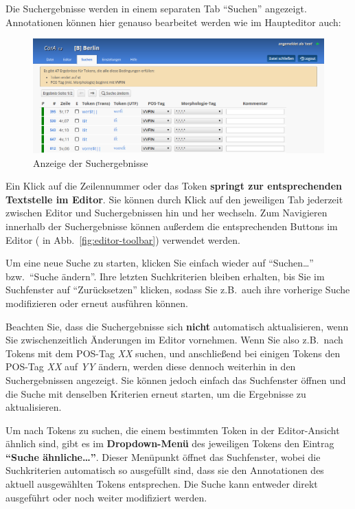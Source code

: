 \documentclass[11pt,a4paper,parskip=half]{scrartcl}
\begin{document}
Die Suchergebnisse werden in einem separaten Tab ``Suchen'' angezeigt.  Annotationen können hier genauso bearbeitet werden wie im Haupteditor auch:

\begin{figure}[!h]
  \centering
  \includegraphics[width=\linewidth]{img/1.2/such-tab2.png}
  \caption{Anzeige der Suchergebnisse}
  \label{fig:such-tab}
\end{figure}

Ein Klick auf die Zeilennummer oder das Token \textbf{springt zur entsprechenden Textstelle im Editor}.  Sie können durch Klick auf den jeweiligen Tab jederzeit zwischen Editor und Suchergebnissen hin und her wechseln.  Zum Navigieren innerhalb der Suchergebnisse können außerdem die entsprechenden Buttons im Editor ( in Abb.~\ref{fig:editor-toolbar}) verwendet werden.

Um eine neue Suche zu starten, klicken Sie einfach wieder auf ``Suchen\ldots'' bzw.\ ``Suche ändern''.  Ihre letzten Suchkriterien bleiben erhalten, bis Sie im Suchfenster auf ``Zurücksetzen'' klicken, sodass Sie z.B.\ auch ihre vorherige Suche modifizieren oder erneut ausführen können.

\begin{infobox}{}
  Beachten Sie, dass die Suchergebnisse sich \textbf{nicht} automatisch aktualisieren, wenn Sie zwischenzeitlich Änderungen im Editor vornehmen.  Wenn Sie also z.B.\ nach Tokens mit dem POS-Tag \emph{XX} suchen, und anschließend bei einigen Tokens den POS-Tag \emph{XX} auf \emph{YY} ändern, werden diese dennoch weiterhin in den Suchergebnissen angezeigt.  Sie können jedoch einfach das Suchfenster öffnen und die Suche mit denselben Kriterien erneut starten, um die Ergebnisse zu aktualisieren.
\end{infobox}

Um nach Tokens zu suchen, die einem bestimmten Token in der Editor-Ansicht
ähnlich sind, gibt es im \textbf{Dropdown-Menü} des jeweiligen Tokens den
Eintrag \textbf{``Suche ähnliche\ldots''}.  Dieser Menüpunkt öffnet das
Suchfenster, wobei die Suchkriterien automatisch so ausgefüllt sind, dass sie
den Annotationen des aktuell ausgewählten Tokens entsprechen.  Die Suche kann
entweder direkt ausgeführt oder noch weiter modifiziert werden.
\end{document}
